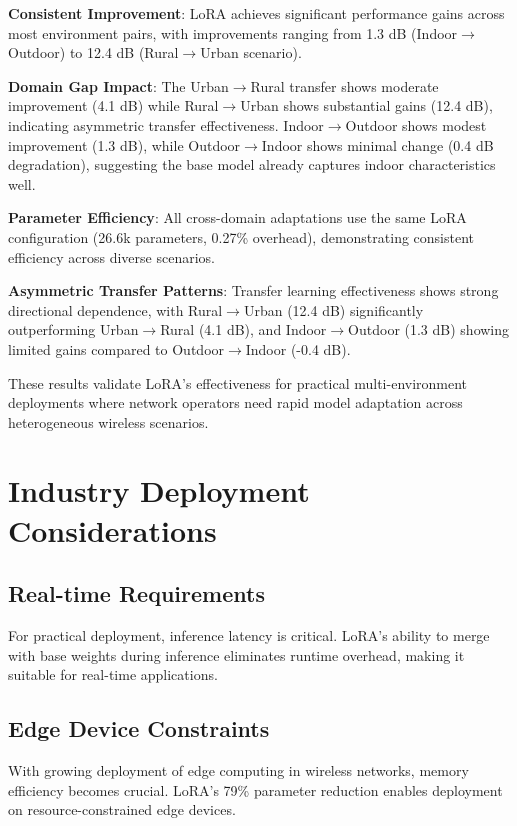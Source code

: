 \documentclass[conference]{IEEEtran}
\begin{document}
\textbf{Consistent Improvement}: LoRA achieves significant performance gains across most environment pairs, with improvements ranging from 1.3 dB (Indoor$\rightarrow$Outdoor) to 12.4 dB (Rural$\rightarrow$Urban scenario).

\textbf{Domain Gap Impact}: The Urban$\rightarrow$Rural transfer shows moderate improvement (4.1 dB) while Rural$\rightarrow$Urban shows substantial gains (12.4 dB), indicating asymmetric transfer effectiveness. Indoor$\rightarrow$Outdoor shows modest improvement (1.3 dB), while Outdoor$\rightarrow$Indoor shows minimal change (0.4 dB degradation), suggesting the base model already captures indoor characteristics well.

\textbf{Parameter Efficiency}: All cross-domain adaptations use the same LoRA configuration (26.6k parameters, 0.27\% overhead), demonstrating consistent efficiency across diverse scenarios.

\textbf{Asymmetric Transfer Patterns}: Transfer learning effectiveness shows strong directional dependence, with Rural$\rightarrow$Urban (12.4 dB) significantly outperforming Urban$\rightarrow$Rural (4.1 dB), and Indoor$\rightarrow$Outdoor (1.3 dB) showing limited gains compared to Outdoor$\rightarrow$Indoor (-0.4 dB).

These results validate LoRA's effectiveness for practical multi-environment deployments where network operators need rapid model adaptation across heterogeneous wireless scenarios.

\section{Industry Deployment Considerations}

\subsection{Real-time Requirements}

For practical deployment, inference latency is critical. LoRA's ability to merge with base weights during inference eliminates runtime overhead, making it suitable for real-time applications.

\subsection{Edge Device Constraints}

With growing deployment of edge computing in wireless networks, memory efficiency becomes crucial. LoRA's 79\% parameter reduction enables deployment on resource-constrained edge devices.
\end{document}
